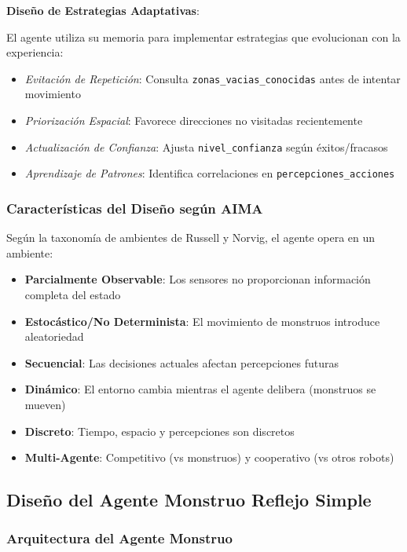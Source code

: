 \documentclass[10pt,twocolumn]{article}
\begin{document}
\textbf{Diseño de Estrategias Adaptativas}:

El agente utiliza su memoria para implementar estrategias que evolucionan con la experiencia:

\begin{itemize}
\item \textit{Evitación de Repetición}: Consulta \texttt{zonas\_vacias\_conocidas} antes de intentar movimiento
\item \textit{Priorización Espacial}: Favorece direcciones no visitadas recientemente
\item \textit{Actualización de Confianza}: Ajusta \texttt{nivel\_confianza} según éxitos/fracasos
\item \textit{Aprendizaje de Patrones}: Identifica correlaciones en \texttt{percepciones\_acciones}
\end{itemize}

\subsubsection{Características del Diseño según AIMA}

Según la taxonomía de ambientes de Russell y Norvig, el agente opera en un ambiente:

\begin{itemize}
\item \textbf{Parcialmente Observable}: Los sensores no proporcionan información completa del estado
\item \textbf{Estocástico/No Determinista}: El movimiento de monstruos introduce aleatoriedad
\item \textbf{Secuencial}: Las decisiones actuales afectan percepciones futuras
\item \textbf{Dinámico}: El entorno cambia mientras el agente delibera (monstruos se mueven)
\item \textbf{Discreto}: Tiempo, espacio y percepciones son discretos
\item \textbf{Multi-Agente}: Competitivo (vs monstruos) y cooperativo (vs otros robots)
\end{itemize}

\subsection{Diseño del Agente Monstruo Reflejo Simple}

\subsubsection{Arquitectura del Agente Monstruo}
\end{document}
